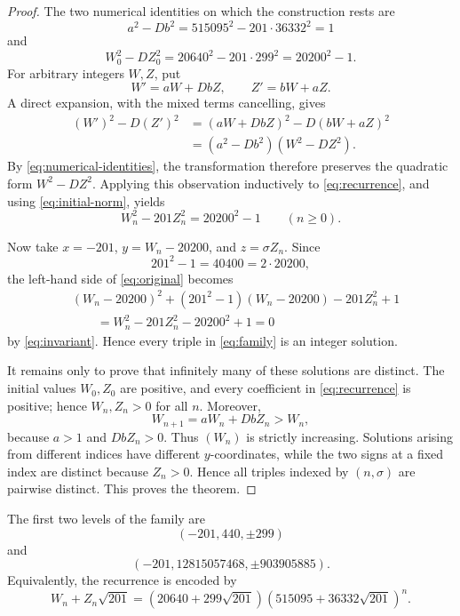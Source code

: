 \documentclass[11pt]{article}
\theoremstyle{remark}
\begin{document}
\begin{proof}
The two numerical identities on which the construction rests are
\begin{equation}\label{eq:numerical-identities}
 a^2-Db^2=515095^2-201\cdot36332^2=1
\end{equation}
and
\begin{equation}\label{eq:initial-norm}
 W_0^2-DZ_0^2
 =20640^2-201\cdot299^2
 =20200^2-1.
\end{equation}
For arbitrary integers $W,Z$, put
\[
 W'=aW+DbZ,
 \qquad
 Z'=bW+aZ.
\]
A direct expansion, with the mixed terms cancelling, gives
\begin{align*}
 (W')^2-D(Z')^2
 &= (aW+DbZ)^2-D(bW+aZ)^2\\
 &= (a^2-Db^2)(W^2-DZ^2).
\end{align*}
By \eqref{eq:numerical-identities}, the transformation therefore preserves the quadratic form $W^2-DZ^2$.  Applying this observation inductively to \eqref{eq:recurrence}, and using \eqref{eq:initial-norm}, yields
\begin{equation}\label{eq:invariant}
 W_n^2-201Z_n^2=20200^2-1
 \qquad(n\geq 0).
\end{equation}

Now take $x=-201$, $y=W_n-20200$, and $z=\sigma Z_n$.  Since
\[
 201^2-1=40400=2\cdot20200,
\]
the left-hand side of \eqref{eq:original} becomes
\begin{align*}
 &(W_n-20200)^2+(201^2-1)(W_n-20200)-201Z_n^2+1\\
 &\qquad =W_n^2-201Z_n^2-20200^2+1=0
\end{align*}
by \eqref{eq:invariant}.  Hence every triple in \eqref{eq:family} is an integer solution.

It remains only to prove that infinitely many of these solutions are distinct.  The initial values $W_0,Z_0$ are positive, and every coefficient in \eqref{eq:recurrence} is positive; hence $W_n,Z_n>0$ for all $n$.  Moreover,
\[
 W_{n+1}=aW_n+DbZ_n>W_n,
\]
because $a>1$ and $DbZ_n>0$.  Thus $(W_n)$ is strictly increasing.  Solutions arising from different indices have different $y$-coordinates, while the two signs at a fixed index are distinct because $Z_n>0$.  Hence all triples indexed by $(n,\sigma)$ are pairwise distinct.  This proves the theorem.
\end{proof}

The first two levels of the family are
\[
 (-201,440,\pm299)
\]
and
\[
 (-201,12815057468,\pm903905885).
\]
Equivalently, the recurrence is encoded by
\begin{equation}\label{eq:closed-form}
 W_n+Z_n\sqrt{201}
 =(20640+299\sqrt{201})
  (515095+36332\sqrt{201})^n.
\end{equation}
\end{document}
